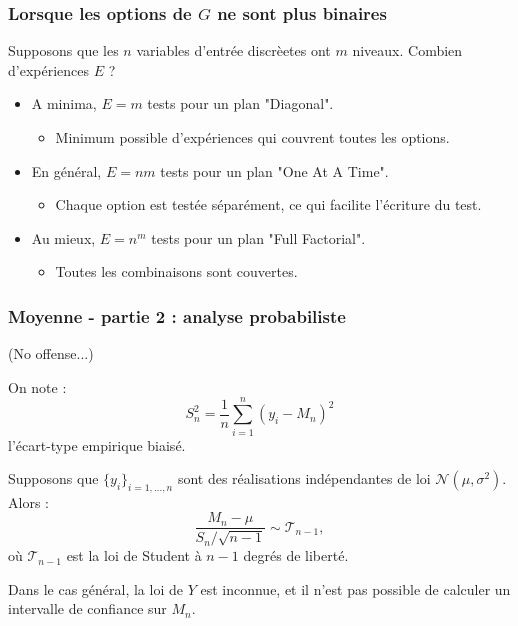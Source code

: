 \documentclass{beamer}
\begin{document}
\begin{frame}[containsverbatim]
\frametitle{Lorsque les options de $G$ ne sont plus binaires}

Supposons que les $n$ variables d'entrée discrèetes ont $m$ niveaux. 
Combien d'expériences $E$ ?
\begin{itemize}
\item A minima, $E=m$ tests pour un plan "Diagonal".
	\begin{itemize}
	\item Minimum possible d'expériences qui couvrent toutes 
	les options. 
	\end{itemize}
\item En général, $E=nm$ tests pour un plan "One At A Time".
	\begin{itemize}
	\item Chaque option est testée séparément, ce qui facilite l'écriture du test. 
	\end{itemize}
\item Au mieux, $E=n^m$ tests pour un plan "Full Factorial".
	\begin{itemize}
	\item Toutes les combinaisons sont couvertes. 
	\end{itemize}
\end{itemize}

\end{frame}

\begin{frame}[containsverbatim]
\frametitle{Moyenne - partie 2 : analyse probabiliste}

(No offense...)

On note :
$$
S_n^2 = \frac{1}{n} \sum_{i=1}^n (y_i-M_n)^2
$$
l'écart-type empirique biaisé.

\begin{theorem}
Supposons que $\{y_i\}_{i=1,\ldots,n}$ sont des réalisations indépendantes de 
loi $\mathcal{N}(\mu,\sigma^2)$. 
Alors :
$$
\frac{M_n-\mu}{S_n/\sqrt{n-1}} \sim \mathcal{T}_{n-1},
$$
où $\mathcal{T}_{n-1}$ est la loi de Student à $n-1$ 
degrés de liberté.
\end{theorem}

Dans le cas général, la loi de $Y$ est inconnue, 
et il n'est pas possible de calculer un intervalle de confiance 
sur $M_n$. 

\end{frame}

\end{document}
